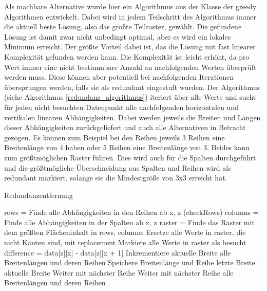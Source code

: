 Als machbare Alternative wurde hier ein Algorithmus aus der Klasse der greedy Algorithmen entwickelt. Dabei wird in jedem Teilschritt des Algorithmus immer die aktuell beste Lösung, also das größte Teilraster, gewählt. Die gefundene Lösung ist damit zwar nicht unbedingt optimal, aber es wird ein lokales Minimum erreicht. Der größte Vorteil dabei ist, das die Lösung mit fast linearer Komplexität gefunden werden kann. Die Komplexität ist leicht erhöht, da pro Wert immer eine nicht bestimmbare Anzahl an nachfolgenden Werten überprüft werden muss. Diese können aber potentiell bei nachfolgenden Iterationen übersprungen werden, falls sie als redundant eingestuft wurden. Der Algorithmus (siehe Algorithmus \ref{redundanz_algorithmus}) iteriert über alle Werte und sucht für jeden nicht besuchten Datenpunkt alle nachfolgenden horizontalen und vertikalen linearen Abhängigkeiten. Dabei werden jeweils die Breiten und Längen dieser Abhängigkeiten zurückgeliefert und auch alle Alternativen in Betracht gezogen. Es können zum Beispiel bei den Reihen jeweils 3 Reihen eine Breitenlänge von 4 haben oder 5 Reihen eine Breitenlänge von 3. Beides kann zum größtmöglichen Raster führen. Dies wird auch für die Spalten durchgeführt und die größtmögliche Überschneidung aus Spalten und Reihen wird als redundant markiert, solange sie die Mindestgröße von 3x3 erreicht hat.

\begin{algorithm}[H]
\begin{algorithmic}
\caption{Redundanzentfernung}
\label{redundanz_algorithmus}
            \State rows = Finde alle Abhängigkeiten in den Reihen ab x, z (checkRows)
            \State columns = Finde alle Abhängigkeiten in der Spalten ab x, z
            \State raster = Finde das Raster mit dem größten Flächeninhalt in rows, columns
                \State Ersetze alle Werte in raster, die nicht Kanten sind, mit replacement
                \State Markiere alle Werte in raster als besucht
            \EndIf
        \EndIf     
    \EndFor
\EndProcedure
{}
        \State difference = data[z][x] - data[z][x + 1]
                \State Inkrementiere aktuelle Breite
                \State\Return alle Breitenlängen und deren Reihen
                \State Speichere Breitenlänge und Reihe
                \State letzte Breite = aktuelle Breite
                \State Weiter mit nächster Reihe
            \Else
                \State Weiter mit nächster Reihe
            \EndIf
        \EndFor
    \EndFor
    \State\Return alle Breitenlängen und deren Reihen
\EndProcedure
\end{algorithmic}
\end{algorithm}